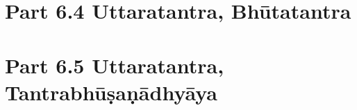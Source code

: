 \documentclass[12pt,tikz
    ]{book}
\begin{document}
        
     \thispagestyle{empty}
     
     \part{Part 6.4 Uttaratantra, Bhūtatantra} %
  
      
            \thispagestyle{empty}
            
    \part{Part 6.5 Uttaratantra, Tantrabhūṣaṇādhyāya} %

            \thispagestyle{empty}

            \thispagestyle{empty}
        
        
            \thispagestyle{empty}
%        
        

        \listoftodos  %

        \newpage
        \thispagestyle {empty}
        \pagecolor{cyan} %
        \ %
\end{document}
